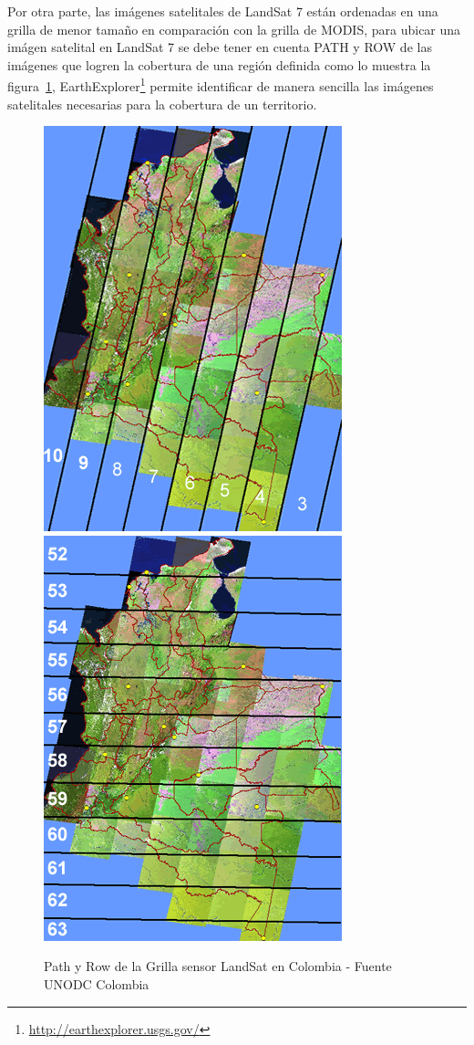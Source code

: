 Por otra parte, las imágenes satelitales de LandSat 7 están ordenadas en una grilla de menor tamaño en comparación con la grilla de MODIS, para ubicar 
una imágen satelital en LandSat 7 se debe tener en cuenta PATH y ROW de las imágenes que logren la cobertura de una región definida como lo muestra 
la figura~\ref{fig:gridlandsat}, EarthExplorer\footnote{\url{http://earthexplorer.usgs.gov/}} permite identificar de manera sencilla las imágenes 
satelitales necesarias para la cobertura de un territorio.
\begin{figure}[htb]
  \centering 
  \includegraphics[scale=0.4]{pictures/pc.png}
  \includegraphics[scale=0.4]{pictures/rc.png}
  \caption{Path y Row de la Grilla sensor LandSat en Colombia - Fuente UNODC Colombia} 
  \label{fig:gridlandsat}
\end{figure}

